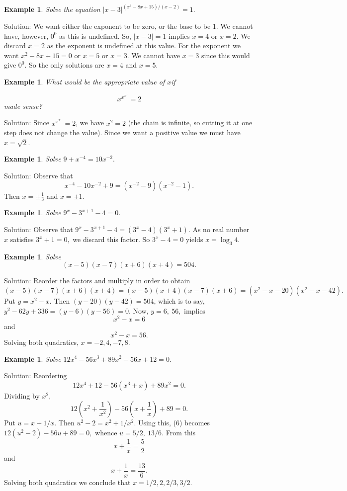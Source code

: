 \documentclass[11pt, openany]{book}
\theoremstyle{change} \theoremheaderfont{\blue\sffamily\bfseries}
\newtheorem{exa}[thm]{Example}
\theoremstyle{nonumberplain} \theoremheaderfont{\sffamily\bfseries}
\newcommand{\dis}{\displaystyle}
\newcommand{\í}{\'{\i}}
\begin{document}
\begin{exa} Solve the equation $\dis{|x - 3|^{(x^2 - 8x + 15)/(x - 2)} = 1.}$

\end{exa}
Solution: We want either the exponent to be zero, or the base to
be 1. We cannot have, however, $0^0$ as this is undefined. So, $|x
- 3| = 1$ implies $x = 4$ or $x = 2.$ We discard $x = 2$ as the
exponent is undefined at this value. For the exponent we want $x^2
- 8x + 15 = 0$ or $x = 5$ or $x = 3.$ We cannot have $x = 3$ since
this would give $0^0$. So the only solutions are $x = 4$ and $x =
5.$
\begin{exa}  What would be the appropriate  value of $x $if

$$x^{x^{x^{.^{.^{.}}}}} = 2$$ made sense?

\end{exa}
Solution: Since $\dis{x^{x^{x^{.^{.^{.}}}}} = 2}$, we have $x^2 =
2$ (the chain is infinite, so cutting it at one step does not
change the value). Since we want a positive value we must have $x
= \sqrt{2}$.


\begin{exa} Solve $9 + x^{-4} = 10x^{-2}.$  \end{exa}
Solution: Observe that
$$x^{-4}  - 10x^{-2} + 9 = (x^{-2} - 9)(x^{-2} - 1).$$Then
$x = \pm \frac{1}{3}$ and $x = \pm 1.$
\begin{exa} Solve $9^x - 3^{x + 1} - 4 = 0.$\end{exa}
Solution: Observe that $9^x - 3^{x + 1} - 4 = (3^x - 4)(3^x + 1).$
As no real number $x$ satisfies  $3^x + 1 = 0,$ we discard this
factor. So $3^x - 4 = 0$ yields $x = \log _3 4.$
\begin{exa} Solve $$(x - 5)(x - 7)(x + 6)(x + 4) = 504.$$ \end{exa}
Solution: Reorder the factors and multiply in order to obtain
$$(x - 5)(x - 7)(x + 6)(x + 4) = (x - 5)(x + 4)(x - 7)(x + 6) = (x^2 - x - 20)(x^2 - x - 42).$$
Put $y = x^2 - x.$ Then $(y - 20)(y - 42) = 504$, which is to say,
$y^2 - 62y + 336 = (y - 6)(y - 56) = 0.$ Now, $y = 6,\  56,$
implies
$$x^2 - x = 6$$and$$x^2 - x = 56.$$Solving both quadratics, $x = -2, 4, -7, 8.$
\begin{exa} Solve $12x^4 - 56x^3 + 89x^2 - 56x + 12 = 0.$ \end{exa}
Solution: Reordering
\begin{equation}12x^4 + 12  - 56(x^3 + x) + 89x^2 = 0.\end{equation}
Dividing by $x^2,$
$$12(x^2 + \frac{1}{x^2}) - 56(x + \frac{1}{x}) + 89 = 0.$$Put $u = x + 1/x.$
Then $u^2 - 2 = x^2 + 1/x^2$. Using this, (6) becomes $12(u^2 - 2)
- 56u + 89 = 0,$ whence $u = 5/2,\ 13/6.$ From this
$$x + \frac{1}{x} = \frac{5}{2}$$ and  $$x + \frac{1}{x} = \frac{13}{6}.$$
Solving both quadratics we conclude that $x = 1/2, 2, 2/3, 3/2.$
\end{document}

